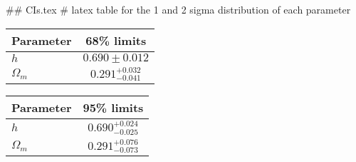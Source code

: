 ## CIs.tex
# latex table for the 1 and 2 sigma distribution of each parameter

\begin{tabular} { l  c}
 Parameter &  68\% limits\\
\hline
{\boldmath$h              $} & $0.690\pm 0.012            $\\
{\boldmath$\Omega_m       $} & $0.291^{+0.032}_{-0.041}   $\\
\hline
\end{tabular}

\begin{tabular} { l  c}
 Parameter &  95\% limits\\
\hline
{\boldmath$h              $} & $0.690^{+0.024}_{-0.025}   $\\
{\boldmath$\Omega_m       $} & $0.291^{+0.076}_{-0.073}   $\\
\hline
\end{tabular}
